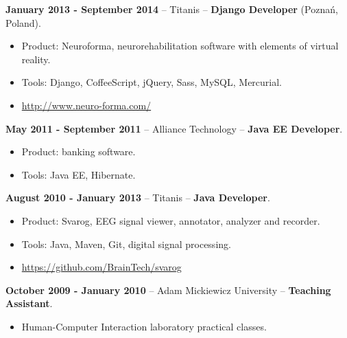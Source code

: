 \documentclass[10pt]{article}
\begin{document}
\textbf{January 2013 - September 2014} -- Titanis -- \textbf{Django Developer} (Poznań, Poland).

\begin{itemize}
 \item Product: Neuroforma, neurorehabilitation software with elements of virtual reality.
 \item Tools: Django, CoffeeScript, jQuery, Sass, MySQL, Mercurial.
 \item \href{http://www.neuro-forma.com/}{http://www.neuro-forma.com/}
\end{itemize}



\textbf{May 2011 - September 2011} -- Alliance Technology -- \textbf{Java EE Developer}.
\begin{itemize}
  \item Product: banking software.
  \item Tools: Java EE, Hibernate.
\end{itemize}

\textbf{August 2010 - January 2013} -- Titanis -- \textbf{Java Developer}.
\begin{itemize}
  \item Product: Svarog, EEG signal viewer, annotator, analyzer and recorder.
  \item Tools: Java, Maven, Git, digital signal processing.
  \item \href{https://github.com/BrainTech/svarog}{https://github.com/BrainTech/svarog}
\end{itemize}

\textbf{October 2009 - January 2010} -- Adam Mickiewicz University -- \textbf{Teaching Assistant}.
\begin{itemize}
 \item Human-Computer Interaction laboratory practical classes.
\end{itemize}


\end{document}
